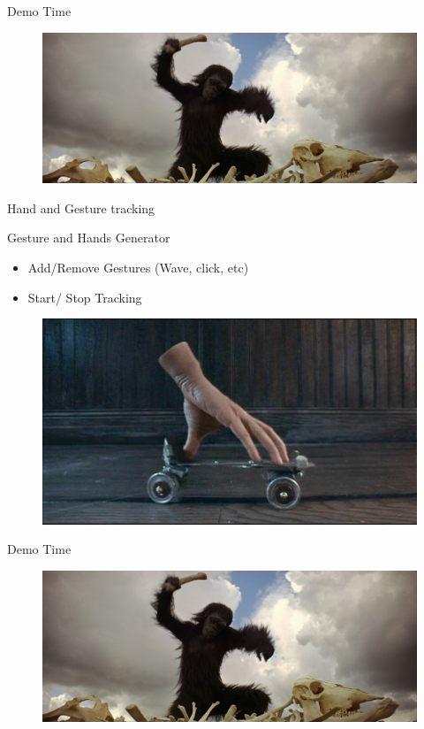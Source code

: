 \documentclass[bigger]{beamer}
\begin{document}
\begin{frame}{ Demo Time}
\begin{figure}[h]
		\includegraphics[scale = 0.15]{Imagenes/demo.png}
\end{figure}
\end{frame}

\begin{frame}{ Hand and Gesture tracking}
\begin{minipage}{0.45\textwidth}
Gesture and Hands Generator
\begin{itemize}
	\item Add/Remove Gestures (Wave, click, etc)
	\item Start/ Stop Tracking
\end{itemize}
\end{minipage}
\begin{minipage}{0.45\textwidth}
\begin{figure}[h]
		\includegraphics[scale = 0.2]{Imagenes/thing.jpg}
\end{figure}
\end{minipage}
\end{frame}

\begin{frame}{ Demo Time}
\begin{figure}[h]
		\includegraphics[scale = 0.15]{Imagenes/demo.png}
\end{figure}
\end{frame}
\end{document}
